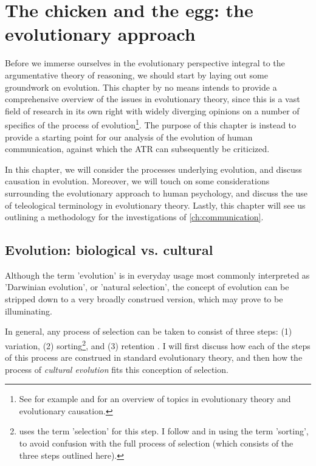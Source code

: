 \chapter{The chicken and the egg: the evolutionary approach}
\label{ch:evolution}
\pagestyle{first}

Before we immerse ourselves in the evolutionary perspective integral to the argumentative theory of reasoning, we should start by laying out some groundwork on evolution.
This chapter by no means intends to provide a comprehensive overview of the issues in evolutionary theory, since this is a vast field of research in its own right with widely diverging opinions on a number of specifics of the process of evolution\footnote{See for example \citet{Ariew02} and \citet{UllerLaland19} for an overview of topics in evolutionary theory and evolutionary causation.}.
The purpose of this chapter is instead to provide a starting point for our analysis of the evolution of human communication, against which the ATR can subsequently be criticized.

In this chapter, we will consider the processes underlying evolution, and discuss causation in evolution. Moreover, we will touch on some considerations surrounding the evolutionary approach to human psychology, and discuss the use of teleological terminology in evolutionary theory. Lastly, this chapter will see us outlining a methodology for the investigations of \cref{ch:communication}.

\section{Evolution: biological vs. cultural}
\label{sec:evo-bio-culture}

Although the term 'evolution' is in everyday usage most commonly interpreted as 'Darwinian evolution', or 'natural selection', the concept of evolution can be stripped down to a very broadly construed version, which may prove to be illuminating.

In general, any process of selection can be taken to consist of three steps: (1) variation, (2) sorting\footnote{\citet{Donahoe03} uses the term 'selection' for this step. I follow \citet{Heyes18} and \citet{S-P13} in using the term 'sorting', to avoid confusion with the full process of selection (which consists of the three steps outlined here).}, and (3) retention \citep{Donahoe03}. I will first discuss how each of the steps of this process are construed in standard evolutionary theory, and then how the process of \emph{cultural evolution} fits this conception of selection.

